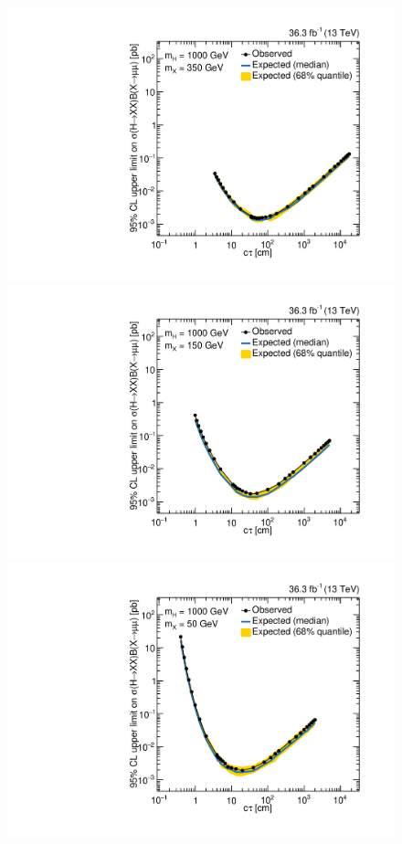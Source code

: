 \begin{figure}[htbp]
  \centering
  \includegraphics[width=\DSquareWidth]{figures/displaced/Limits_2Mu_1000_350_HybridNew.pdf}
  \hspace*{-2em}
  \includegraphics[width=\DSquareWidth]{figures/displaced/Limits_2Mu_1000_150_HybridNew.pdf} \\
  \includegraphics[width=\DSquareWidth]{figures/displaced/Limits_2Mu_1000_50_HybridNew.pdf}

\end{figure}
